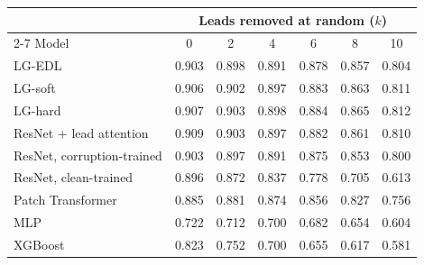 \begin{tabular}{@{}lcccccc@{}}
\toprule
& \multicolumn{6}{c}{Leads removed at random ($k$)} \\
\cmidrule(l){2-7}
Model & 0 & 2 & 4 & 6 & 8 & 10 \\
\midrule
LG-EDL & 0.903 & 0.898 & 0.891 & 0.878 & 0.857 & 0.804 \\
LG-soft & 0.906 & 0.902 & 0.897 & 0.883 & 0.863 & 0.811 \\
LG-hard & 0.907 & 0.903 & 0.898 & 0.884 & 0.865 & 0.812 \\
ResNet + lead attention & 0.909 & 0.903 & 0.897 & 0.882 & 0.861 & 0.810 \\
ResNet, corruption-trained & 0.903 & 0.897 & 0.891 & 0.875 & 0.853 & 0.800 \\
ResNet, clean-trained & 0.896 & 0.872 & 0.837 & 0.778 & 0.705 & 0.613 \\
Patch Transformer & 0.885 & 0.881 & 0.874 & 0.856 & 0.827 & 0.756 \\
MLP & 0.722 & 0.712 & 0.700 & 0.682 & 0.654 & 0.604 \\
XGBoost & 0.823 & 0.752 & 0.700 & 0.655 & 0.617 & 0.581 \\
\bottomrule
\end{tabular}
